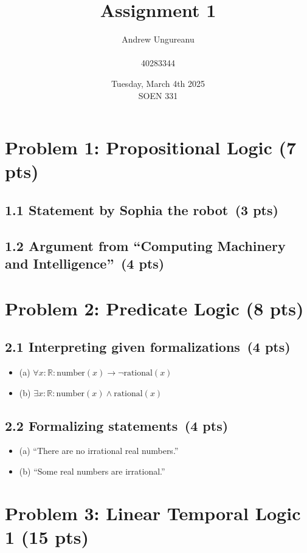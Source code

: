 \documentclass[11pt]{article}
\title{Assignment 1 \\\vspace{1in}}
\author{Andrew Ungureanu \\
        \\40283344}
\date{Tuesday, March 4th 2025\\
            SOEN 331}
\begin{document}
\maketitle

\newpage
\section{Problem 1: Propositional Logic (7 pts)}

\subsection*{1.1 Statement by Sophia the robot \,(3 pts)}


\subsection*{1.2 Argument from “Computing Machinery and Intelligence” \,(4 pts)}


\newpage
\section{Problem 2: Predicate Logic (8 pts)}

\subsection*{2.1 Interpreting given formalizations \,(4 pts)}
\begin{itemize}
    \item (a) \(\forall x : \mathbb{R} : \text{number}(x) \to \neg \text{rational}(x)\)
    \item (b) \(\exists x : \mathbb{R} : \text{number}(x) \wedge \text{rational}(x)\)
\end{itemize}

\subsection*{2.2 Formalizing statements \,(4 pts)}
\begin{itemize}
    \item (a) “There are no irrational real numbers.”
    \item (b) “Some real numbers are irrational.”
\end{itemize}

\newpage
\section{Problem 3: Linear Temporal Logic 1 (15 pts)}
\end{document}
